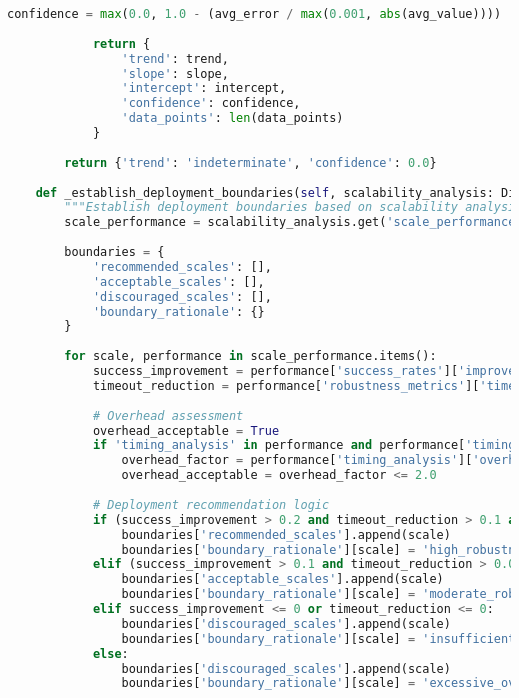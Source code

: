 \begin{lstlisting}[language=Python, caption=Scalability Analysis for Deployment Planning]
            confidence = max(0.0, 1.0 - (avg_error / max(0.001, abs(avg_value))))
            
            return {
                'trend': trend,
                'slope': slope,
                'intercept': intercept,
                'confidence': confidence,
                'data_points': len(data_points)
            }
        
        return {'trend': 'indeterminate', 'confidence': 0.0}
    
    def _establish_deployment_boundaries(self, scalability_analysis: Dict[str, Any]) -> Dict[str, Any]:
        """Establish deployment boundaries based on scalability analysis"""
        scale_performance = scalability_analysis.get('scale_performance', {})
        
        boundaries = {
            'recommended_scales': [],
            'acceptable_scales': [],
            'discouraged_scales': [],
            'boundary_rationale': {}
        }
        
        for scale, performance in scale_performance.items():
            success_improvement = performance['success_rates']['improvement']
            timeout_reduction = performance['robustness_metrics']['timeout_reduction']
            
            # Overhead assessment
            overhead_acceptable = True
            if 'timing_analysis' in performance and performance['timing_analysis']:
                overhead_factor = performance['timing_analysis']['overhead_factor']
                overhead_acceptable = overhead_factor <= 2.0
            
            # Deployment recommendation logic
            if (success_improvement > 0.2 and timeout_reduction > 0.1 and overhead_acceptable):
                boundaries['recommended_scales'].append(scale)
                boundaries['boundary_rationale'][scale] = 'high_robustness_benefit_acceptable_overhead'
            elif (success_improvement > 0.1 and timeout_reduction > 0.05 and overhead_acceptable):
                boundaries['acceptable_scales'].append(scale)
                boundaries['boundary_rationale'][scale] = 'moderate_robustness_benefit_acceptable_overhead'
            elif success_improvement <= 0 or timeout_reduction <= 0:
                boundaries['discouraged_scales'].append(scale)
                boundaries['boundary_rationale'][scale] = 'insufficient_robustness_benefit'
            else:
                boundaries['discouraged_scales'].append(scale)
                boundaries['boundary_rationale'][scale] = 'excessive_overhead'
        

\end{lstlisting}
